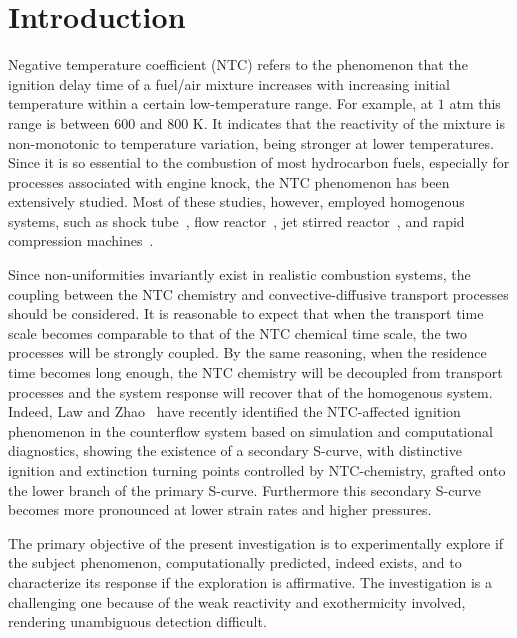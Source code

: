 \documentclass[review,3p,times]{elsarticleUS}
\begin{document}
\section{Introduction}

Negative temperature coefficient (NTC) refers to the phenomenon that the ignition delay time of a fuel/air mixture increases with increasing initial temperature within a certain low-temperature range. For example, at $1$ atm this range is between $600$ and $800$ K. It indicates that the reactivity of the mixture is non-monotonic to temperature variation, being stronger at lower temperatures. Since it is so essential to the combustion of most hydrocarbon fuels, especially for processes associated with engine knock, the NTC phenomenon has been extensively studied. Most of these studies, however, employed homogenous systems, such as shock tube~\cite{ciezki93}, flow reactor~\cite{wada11}, jet stirred reactor~\cite{veloo13}, and rapid compression machines~\cite{mittal08}.

Since non-uniformities invariantly exist in realistic combustion systems, the coupling between the NTC chemistry and convective-diffusive transport processes should be considered. It is reasonable to expect that when the transport time scale becomes comparable to that of the NTC chemical time scale, the two processes will be strongly coupled. By the same reasoning, when the residence time becomes long enough, the NTC chemistry will be decoupled from transport processes and the system response will recover that of the homogenous system. Indeed, Law and Zhao~\cite{law12} have recently identified the NTC-affected ignition phenomenon in the counterflow system based on simulation and computational diagnostics, showing the existence of a secondary S-curve, with distinctive ignition and extinction turning points controlled by NTC-chemistry, grafted onto the lower branch of the primary S-curve. Furthermore this secondary S-curve becomes more pronounced at lower strain rates and higher pressures.

The primary objective of the present investigation is to experimentally explore if the subject phenomenon, computationally predicted, indeed exists, and to characterize its response if the exploration is affirmative. The investigation is a challenging one because of the weak reactivity and exothermicity involved, rendering unambiguous detection difficult.
\end{document}
